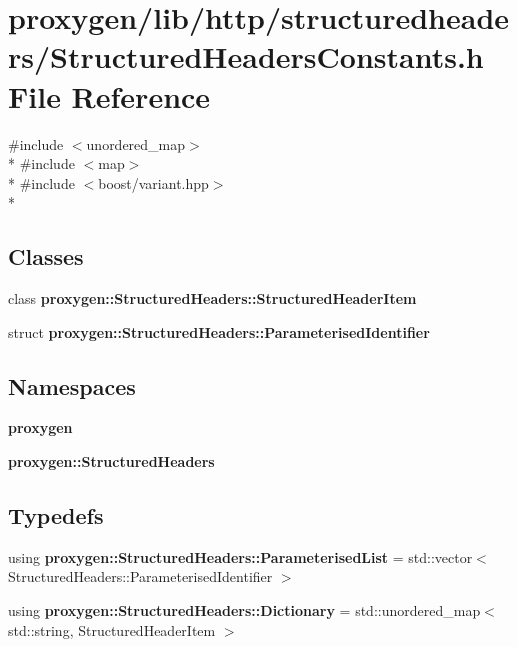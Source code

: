 \section{proxygen/lib/http/structuredheaders/\+Structured\+Headers\+Constants.h File Reference}
\label{StructuredHeadersConstants_8h}
{\ttfamily \#include $<$unordered\+\_\+map$>$}\\*
{\ttfamily \#include $<$map$>$}\\*
{\ttfamily \#include $<$boost/variant.\+hpp$>$}\\*
\subsection*{Classes}
\begin{DoxyCompactItemize}
\item 
class {\bf proxygen\+::\+Structured\+Headers\+::\+Structured\+Header\+Item}
\item 
struct {\bf proxygen\+::\+Structured\+Headers\+::\+Parameterised\+Identifier}
\end{DoxyCompactItemize}
\subsection*{Namespaces}
\begin{DoxyCompactItemize}
\item 
 {\bf proxygen}
\item 
 {\bf proxygen\+::\+Structured\+Headers}
\end{DoxyCompactItemize}
\subsection*{Typedefs}
\begin{DoxyCompactItemize}
\item 
using {\bf proxygen\+::\+Structured\+Headers\+::\+Parameterised\+List} = std\+::vector$<$ Structured\+Headers\+::\+Parameterised\+Identifier $>$
\item 
using {\bf proxygen\+::\+Structured\+Headers\+::\+Dictionary} = std\+::unordered\+\_\+map$<$ std\+::string, Structured\+Header\+Item $>$
\end{DoxyCompactItemize}
